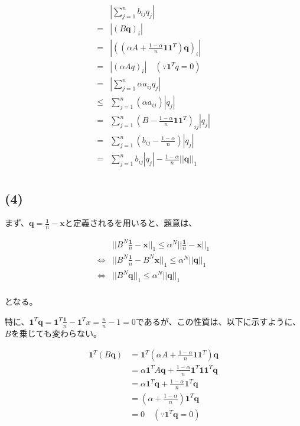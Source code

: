 \documentclass[a4paper, 10pt, dvipdfmx]{jlreq}
\begin{document}
\begin{align*}
       & \left|\sum_{j=1}^nb_{ij}q_j\right|                                            \\
  =    & |(B\bm{q})_i|                                                                 \\
  =    & \left|\left((\alpha A+\frac{1-\alpha}{n}\bm{1}\bm{1}^T)\bm{q}\right)_i\right| \\
  =    & \left|(\alpha Aq)_i\right| \quad (\because \bm{1}^Tq=0)                       \\
  =    & \left|\sum_{j=1}^n\alpha a_{ij}q_j\right|                                     \\
  \leq & \sum_{j=1}^n(\alpha a_{ij})|q_j|                                              \\
  =    & \sum_{j=1}^n \left(B-\frac{1-\alpha}{n}\bm{1}\bm{1}^T\right)_{ij}|q_j|        \\
  =    & \sum_{j=1}^n \left(b_{ij}-\frac{1-\alpha}{n}\right)|q_j|                      \\
  =    & \sum_{j=1}^n b_{ij}|q_j|-\frac{1-\alpha}{n}||\bm{q}||_1                       \\
\end{align*}

\subsection*{(4)}

まず、$\bm{q}=\frac{\bm{1}}{n}-\bm{x}$と定義されるを用いると、題意は、

\begin{align*}
                  & ||B^N\frac{\bm{1}}{n}-\bm{x}||_1 \leq \alpha^N ||\frac{\bm{1}}{n}-\bm{x}||_1 \\
  \Leftrightarrow & ||B^N\frac{\bm{1}}{n}-B^N\bm{x}||_1 \leq \alpha^N ||\bm{q}||_1               \\
  \Leftrightarrow & ||B^N\bm{q}||_1 \leq \alpha^N ||\bm{q}||_1                                   \\
\end{align*}

となる。

特に、$\bm{1}^T\bm{q}=\bm{1}^T\frac{\bm{1}}{n}-\bm{1}^Tx=\frac{n}{n}-1=0$であるが、この性質は、以下に示すように、$B$を乗じても変わらない。

\begin{align*}
  \bm{1}^T(B\bm{q}) & =\bm{1}^T \left(\alpha A+\frac{1-\alpha}{n}\bm{1}\bm{1}^T\right)\bm{q} \\
                    & =\alpha \bm{1}^TA\bm{q}+\frac{1-\alpha}{n}\bm{1}^T\bm{1}\bm{1}^T\bm{q} \\
                    & =\alpha \bm{1}^T\bm{q}+\frac{1-\alpha}{n}\bm{1}^T\bm{q}                \\
                    & =\left(\alpha+\frac{1-\alpha}{n}\right)\bm{1}^T\bm{q}                  \\
                    & =0 \quad (\because \bm{1}^T\bm{q}=0)
\end{align*}
\end{document}
